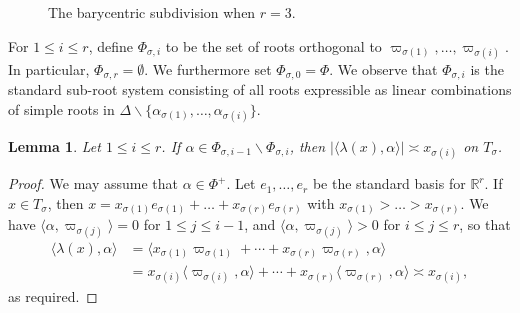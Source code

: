 \documentclass[12pt]{amsart}
\newtheorem{lemma}[theorem]{Lemma}
\theoremstyle{remark}
\newcommand{\R}{\mathbb R}
\begin{document}
\begin{figure}[ht]
\centering


\caption{\label{bary-fig} The barycentric subdivision when $r=3$.}
\end{figure}


For $1 \le i \le r$, define $\Phi_{\sigma, i}$ to be the set of roots orthogonal to $\varpi_{\sigma(1)}, \ldots, \varpi_{\sigma(i)}$. In particular, $\Phi_{\sigma,r}=\emptyset$. We furthermore set $\Phi_{\sigma,0}=\Phi$. We observe that $\Phi_{\sigma, i}$ is the standard sub-root system consisting of all roots expressible as linear combinations of simple roots in $\Delta\smallsetminus\{\alpha_{\sigma(1)}, \ldots, \alpha_{\sigma(i)}\}$.


\begin{lemma}
\label{rootsize}
Let $1\le i\le r$. If $\alpha \in \Phi_{\sigma, i-1} \smallsetminus \Phi_{\sigma, i}$, then $| \langle \lambda(x), \alpha \rangle | \asymp x_{\sigma(i)}$ on $T_\sigma$.
\end{lemma}


\begin{proof}
We may assume that $\alpha \in \Phi^+$.  Let $e_1, \ldots, e_r$ be the standard basis for $\R^r$. If $x \in T_\sigma$, then $x = x_{\sigma(1)} e_{\sigma(1)} + \ldots + x_{\sigma(r)} e_{\sigma(r)}$ with $x_{\sigma(1)} > \ldots > x_{\sigma(r)}$. We have $\langle \alpha, \varpi_{\sigma(j)} \rangle = 0$ for $1 \le j \le i-1$, and $\langle \alpha, \varpi_{\sigma(j)} \rangle > 0$ for $i \le j \le r$, so that
\begin{align*}
\langle \lambda(x), \alpha \rangle & = \langle x_{\sigma(1)} \varpi_{\sigma(1)} + \cdots + x_{\sigma(r)} \varpi_{\sigma(r)}, \alpha \rangle \\
& = x_{\sigma(i)} \langle \varpi_{\sigma(i)}, \alpha \rangle + \cdots + x_{\sigma(r)} \langle \varpi_{\sigma(r)}, \alpha \rangle \asymp x_{\sigma(i)},
\end{align*}
as required.
\end{proof}
\end{document}
